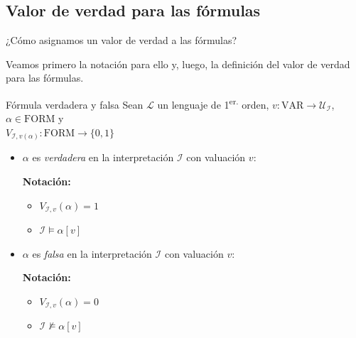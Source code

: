\subsection{Valor de verdad para las fórmulas}

¿Cómo asignamos un valor de verdad a las fórmulas?

Veamos primero la notación para ello y, luego, la definición del valor de 
verdad para las fórmulas.
\begin{definicion}{Fórmula verdadera y falsa}{}
    Sean $\mathcal{L}$ un lenguaje de 1\textsuperscript{er.} orden,
    $v: \mathrm{VAR} \to \mathcal{U}_{\mathcal{I}}$,
    $\alpha \in \mathrm{FORM}$ y \\
    $V_{\mathcal{I}, v(\alpha)}: \mathrm{FORM} \to \{ 0,1 \}$
    \begin{itemize}
        \item $\alpha$ es \textit{verdadera} en la interpretación 
            $\mathcal{I}$ con valuación $v$:

            \textbf{Notación:}
            \begin{multicols}{2}
                \begin{itemize}
                    \item $V_{\mathcal{I}, v}(\alpha) = 1$
                    \item $\mathcal{I} \vDash \alpha [v]$
                \end{itemize}
            \end{multicols}

        \item $\alpha$ es \textit{falsa} en la interpretación 
            $\mathcal{I}$ con valuación $v$:

            \textbf{Notación:}
            \begin{multicols}{2}
                \begin{itemize}
                    \item $V_{\mathcal{I}, v}(\alpha) = 0$
                    \item $\mathcal{I} \nvDash \alpha [v]$
                \end{itemize}
            \end{multicols}
    \end{itemize}
\end{definicion}

